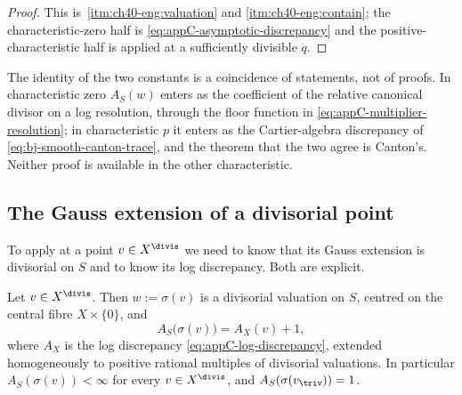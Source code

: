 \begin{proof}
This is \,\cref{itm:ch40-eng:valuation} and
\cref{itm:ch40-eng:contain}; the characteristic-zero half is
\eqref{eq:appC-asymptotic-discrepancy} and the positive-characteristic half
is  applied at a sufficiently divisible $q$.
\end{proof}

The identity of the two constants is a coincidence of statements, not of
proofs.  In characteristic zero $A_S(w)$ enters as the coefficient of the
relative canonical divisor on a log resolution, through the floor function
in \eqref{eq:appC-multiplier-resolution}; in characteristic $p$ it enters
as the Cartier-algebra discrepancy of \eqref{eq:bj-smooth-canton-trace}, and
the theorem that the two agree is Canton's.  Neither proof is available in
the other characteristic.

\subsection{The Gauss extension of a divisorial point}
\label{sec:ch40-gauss-divisorial}

To apply  at a point $v\in X^{\divis}$ we
need to know that its Gauss extension is divisorial on $S$ and to know its
log discrepancy.  Both are explicit.

\begin{lemma}
\label{lem:ch40-gauss-log-discrepancy}
Let $v\in X^{\divis}$.  Then $w:=\sigma(v)$ is a divisorial valuation on
$S$, centred on the central fibre $X\times\{0\}$, and
\[
 A_S\bigl(\sigma(v)\bigr)=A_X(v)+1,
\]
where $A_X$ is the log discrepancy \eqref{eq:appC-log-discrepancy},
extended homogeneously to positive rational multiples of divisorial
valuations.  In particular $A_S(\sigma(v))<\infty$ for every
$v\in X^{\divis}$, and $A_S(\sigma(v_{\triv}))=1$.
\end{lemma}

